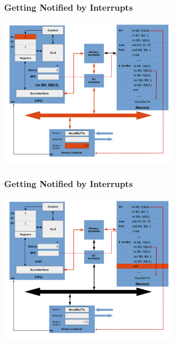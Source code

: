\documentclass{beamer}
\begin{document}
\begin{frame}[fragile]
\frametitle{Getting Notified by Interrupts}

\begin{center}
\vspace*{-0.23cm}
\hspace*{-1cm}\includegraphics[width=8.7cm]{interrupt_waiting24.pdf}
\end{center}

\end{frame}

\begin{frame}[fragile]
\frametitle{Getting Notified by Interrupts}

\begin{center}
\vspace*{-0.23cm}
\hspace*{-1cm}\includegraphics[width=8.7cm]{interrupt_waiting25.pdf}
\end{center}

\end{frame}
\end{document}
